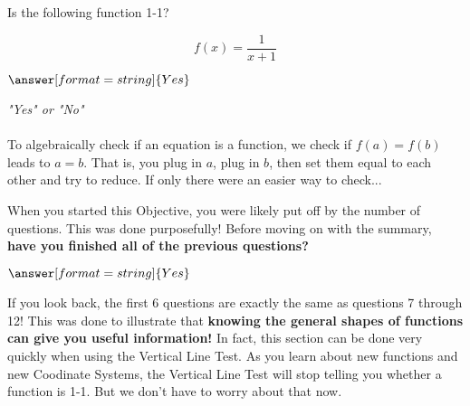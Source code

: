 \documentclass{ximera}
\begin{document}
\begin{question}
Is the following function 1-1?
 
$$ f(x) = \frac{1}{x+1} $$
 
$\answer[format=string]{Yes}$
 
\begin{hint}
\textit{"Yes" or "No"} \\ \\
To algebraically check if an equation is a function, we check if $f(a) = f(b)$ leads to $a = b$. That is, you plug in $a$, plug in $b$, then set them equal to each other and try to reduce. If only there were an easier way to check...
\end{hint}
 
\end{question}
 
\begin{question}
When you started this Objective, you were likely put off by the number of questions. This was done purposefully! Before moving on with the summary, \textbf{have you finished all of the previous questions?}
 
$\answer[format=string]{Yes}$
 
\begin{feedback}[correct]
If you look back, the first 6 questions are exactly the same as questions 7 through 12! This was done to illustrate that \textbf{knowing the general shapes of functions can give you useful information!} In fact, this section can be done very quickly when using the Vertical Line Test. As you learn about new functions and new Coodinate Systems, the Vertical Line Test will stop telling you whether a function is 1-1. But we don't have to worry about that now.
\end{feedback}
 
\end{question}
 
\end{document}
